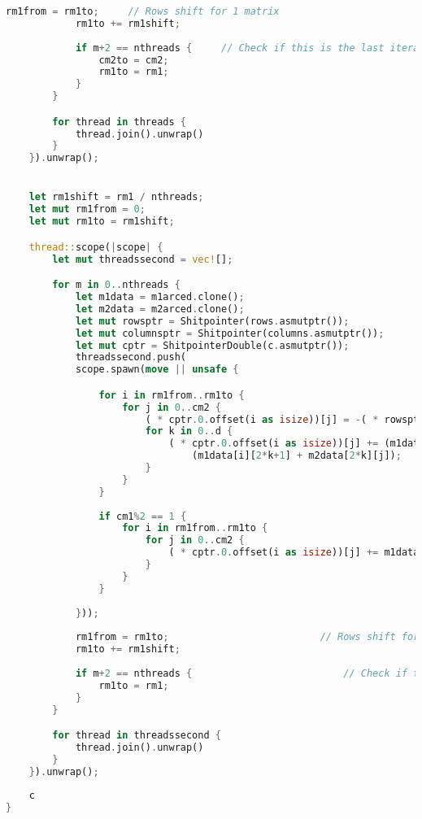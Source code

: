 \begin{lstlisting}[language=Rust, caption={ Реализация алгоритма Винограда умножения матриц с  использованием параллелизма},
                    label={list:Mwinograd}]
            rm1from = rm1to;     // Rows shift for 1 matrix
            rm1to += rm1shift;
    
            if m+2 == nthreads {     // Check if this is the last iteration;
                cm2to = cm2;
                rm1to = rm1;
            }
        }

        for thread in threads {
            thread.join().unwrap()
        }
    }).unwrap();


    let rm1shift = rm1 / nthreads;
    let mut rm1from = 0;
    let mut rm1to = rm1shift;

    thread::scope(|scope| {
        let mut threadssecond = vec![];

        for m in 0..nthreads {
            let m1data = m1arced.clone();
            let m2data = m2arced.clone();
            let mut rowsptr = Shitpointer(rows.asmutptr());
            let mut columnsptr = Shitpointer(columns.asmutptr());
            let mut cptr = ShitpointerDouble(c.asmutptr());
            threadssecond.push(
            scope.spawn(move || unsafe { 

                for i in rm1from..rm1to { 
                    for j in 0..cm2 {
                        ( * cptr.0.offset(i as isize))[j] = -( * rowsptr.0.offset(i as isize)) - ( * columnsptr.0.offset(j as isize));
                        for k in 0..d {
                            ( * cptr.0.offset(i as isize))[j] += (m1data[i][2*k] + m2data[2*k+1][j]) *
                                (m1data[i][2*k+1] + m2data[2*k][j]);
                        }
                    }
                }
    
                if cm1%2 == 1 {
                    for i in rm1from..rm1to {
                        for j in 0..cm2 {
                            ( * cptr.0.offset(i as isize))[j] += m1data[i][cm1-1] * m2data[cm1-1][j];
                        }
                    }
                }
            
            }));
    
            rm1from = rm1to;                          // Rows shift for 1 matrix
            rm1to += rm1shift;
    
            if m+2 == nthreads {                          // Check if this is the last iteration;
                rm1to = rm1;
            }
        }

        for thread in threadssecond {
            thread.join().unwrap()
        }
    }).unwrap();
    
    c
}
\end{lstlisting}
